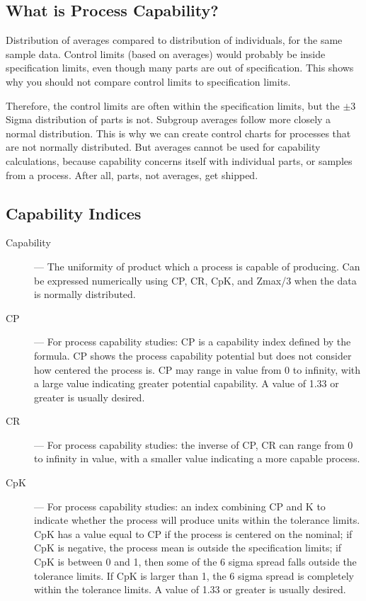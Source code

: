 \documentclass[MASTER-SPC.tex]{subfiles}
\begin{document}
\subsection{What is Process Capability?}

Distribution of averages compared to distribution of individuals, for the same sample data. Control limits (based on averages) would probably be inside specification limits, even though many parts are out of specification. This shows why you should not compare control limits to specification limits.

Therefore, the control limits are often within the specification limits, but the $\pm 3$ Sigma distribution of parts is not.  Subgroup averages follow more closely a normal distribution. This is why we can create control charts for processes that are not normally distributed. But averages cannot be used for capability calculations, because capability concerns itself with individual parts, or samples from a process. After all, parts, not averages, get shipped.

\subsection{Capability Indices}

\begin{description}
	\item[Capability] — The uniformity of product which a process is capable of producing. Can be expressed numerically using CP, CR, CpK, and Zmax/3 when the data is normally distributed.
	
	\item[CP] — For process capability studies: CP is a capability index defined by the formula. CP shows the process capability potential but does not consider how centered the process is. CP may range in value from 0 to infinity, with a large value indicating greater potential capability. A value of 1.33 or greater is usually desired.
	
	\item[CR] — For process capability studies: the inverse of CP, CR can range from 0 to infinity in value, with a smaller value indicating a more capable process.
	
	\item[CpK] — For process capability studies: an index combining CP and K to indicate whether the process will produce units within the tolerance limits. CpK has a value equal to CP if the process is centered on the nominal; if CpK is negative, the process mean is outside the specification limits; if CpK is between 0 and 1, then some of the 6 sigma spread falls outside the tolerance limits. If CpK is larger than 1, the 6 sigma spread is completely within the tolerance limits. A value of 1.33 or greater is usually desired.
\end{description}
\newpage
\end{document}
